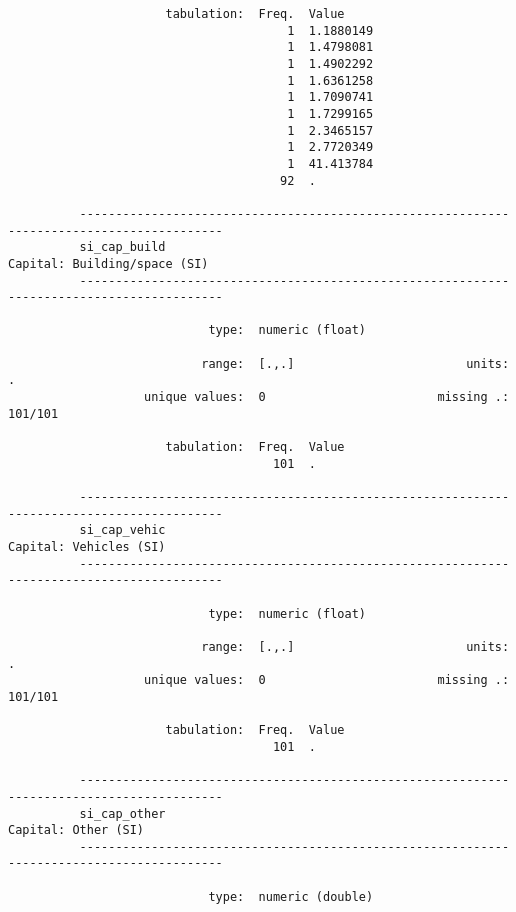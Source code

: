 \documentclass{article}
\begin{document}
\begin{verbatim}
                      tabulation:  Freq.  Value
                                       1  1.1880149
                                       1  1.4798081
                                       1  1.4902292
                                       1  1.6361258
                                       1  1.7090741
                                       1  1.7299165
                                       1  2.3465157
                                       1  2.7720349
                                       1  41.413784
                                      92  .
          
          ------------------------------------------------------------------------------------------
          si_cap_build                                                  Capital: Building/space (SI)
          ------------------------------------------------------------------------------------------
          
                            type:  numeric (float)
          
                           range:  [.,.]                        units:  .
                   unique values:  0                        missing .:  101/101
          
                      tabulation:  Freq.  Value
                                     101  .
          
          ------------------------------------------------------------------------------------------
          si_cap_vehic                                                        Capital: Vehicles (SI)
          ------------------------------------------------------------------------------------------
          
                            type:  numeric (float)
          
                           range:  [.,.]                        units:  .
                   unique values:  0                        missing .:  101/101
          
                      tabulation:  Freq.  Value
                                     101  .
          
          ------------------------------------------------------------------------------------------
          si_cap_other                                                           Capital: Other (SI)
          ------------------------------------------------------------------------------------------
          
                            type:  numeric (double)
          

\end{verbatim}
\end{document}

